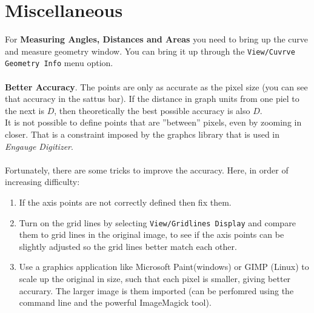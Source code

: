 \documentclass[norsk]{article} %
\numberwithin{equation}{section} %
\numberwithin{figure}{section} %
\numberwithin{table}{section} %
\begin{document}
      
\section{Miscellaneous}
For \textbf{Measuring Angles, Distances and Areas} you need to bring up the curve and measure geometry window.
You can bring it up through the \texttt{View/Cuvrve Geometry Info} menu option.\\ 
\\
\textbf{Better Accuracy}. The points are only as accurate as the pixel size (you can see that
accuracy in the sattus bar). If the distance in graph units from one piel to the next is
$D$, then theoretically the best possible accuracy is also $D$.\\
It is not possible to define points that are ''between'' pixels, even by zooming in closer.
That is a constraint imposed by the graphcs library that is used in \textit{Engauge Digitizer}.\\
\\
Fortunately, there are some tricks to improve the accuracy. Here, in order of increasing difficulty:
\begin{enumerate}
   \item If the axis points are not correctly defined then fix them.
   \item Turn on the grid lines by selecting \texttt{View/Gridlines Display} and compare them to
      grid lines in the original image, to see if the axis points can be slightly adjusted so
      the grid lines better match each other.
   \item Use a graphics application like Microsoft Paint(windows) or GIMP (Linux) to scale up the 
      original in size, such that each pixel is smaller, giving better accurary. The larger 
      image is them imported (can be perfomred using the command line and the powerful ImageMagick tool).
\end{enumerate}


%
\end{document}

